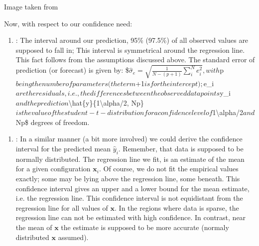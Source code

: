 \documentclass[letterpaper,10pt,english]{jupyterBook}
\begin{document}
\sphinxAtStartPar
Image taken from 

\sphinxAtStartPar
Now, with respect to our confidence need:
\begin{enumerate}
%
\item {} 
\sphinxAtStartPar
{}: The interval around our prediction, 95\% (97.5\%) of all observed values are supposed to fall in; This interval is symmetrical around the regression line. This fact follows from the assumptions discussed above. The standard error of prediction (or forecast) is given by: \$\(\hat{\sigma}_e = \sqrt{\frac{1}{N-(p+1)}\sum_i^N e_i^2},\)\(
with \)p\( being the number of parameters (the term \)+1\( is for the intercept); \)e\_i\( are the residuals, i.e., the differences between the observed data points \)y\_i\( and the prediction \)\textbackslash{}hat\{y\}\{1\sphinxhyphen{}\textbackslash{}alpha/2, N\sphinxhyphen{}p\}\( is the value of the student-t-distribution for a confidence level of \)1\sphinxhyphen{}\textbackslash{}alpha/2\( and \)N\sphinxhyphen{}p\$ degrees of freedom.

\end{enumerate}
\begin{enumerate}
%
\item {} 
\sphinxAtStartPar
{}: In a similar manner (a bit more involved) we could derive the confidence interval for the predicted mean \(\hat{y}_i\). Remember, that data is supposed to be normally distributed. The regression line we fit, is an estimate of the mean for a given configuration \(\mathbf{x}_i\). Of course, we do not fit the empirical values exactly; some may be lying above the regression line, some beneath. This confidence interval gives an upper and a lower bound for the mean estimate, i.e. the regression line. This confidence interval is not equidistant from the regression line for all values of \(\mathbf{x}\). In the regions where data is sparse, the regression line can not be estimated with high confidence. In contrast, near the mean of \(\mathbf{x}\) the estimate is supposed to be more accurate (normaly distributed \(\mathbf{x}\) assumed).

\end{enumerate}
\end{document}
